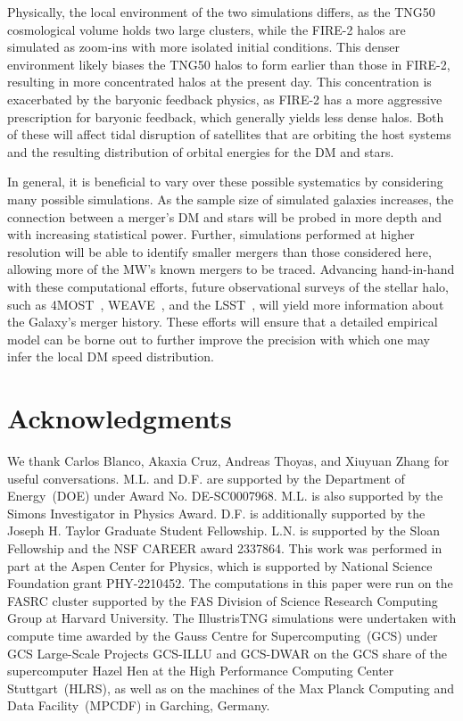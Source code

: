 \documentclass[twocolumn,tighten,twocolappendix]{aastex701}
\begin{document}
Physically, the local environment of the two simulations differs, as the TNG50 cosmological volume holds two large clusters, while the FIRE-2 halos are simulated as zoom-ins with more isolated initial conditions. This denser environment likely biases the TNG50 halos to form earlier than those in FIRE-2, resulting in more concentrated halos at the present day. This concentration is exacerbated by the baryonic feedback physics, as FIRE-2 has a more aggressive prescription for baryonic feedback, which generally yields less dense halos. Both of these will affect tidal disruption of satellites that are orbiting the host systems and the resulting distribution of orbital energies for the DM and stars. 

In general, it is beneficial to vary over these possible systematics by considering many possible simulations. As the sample size of simulated galaxies increases, the connection between a merger's DM and stars will be probed in more depth and with increasing statistical power. Further, simulations performed at higher resolution will be able to identify smaller mergers than those considered here, allowing more of the MW's known mergers to be traced. Advancing hand-in-hand with these computational efforts, future observational surveys of the stellar halo, such as 4MOST~\citep{2019Msngr.175...23H}, WEAVE~\citep{2024MNRAS.530.2688J}, and the LSST~\citep{2019ApJ...873..111I}, will yield more information about the Galaxy's merger history. These efforts will ensure that a detailed empirical model can be borne out to further improve the precision with which one may infer the local DM speed distribution.

\section*{Acknowledgments}
We thank Carlos Blanco, Akaxia Cruz, Andreas Thoyas, and Xiuyuan Zhang for useful conversations. M.L. and D.F. are supported by the Department of Energy~(DOE) under Award No. DE-SC0007968. M.L. is also supported by the Simons Investigator in Physics Award. D.F. is additionally supported by the Joseph H. Taylor Graduate Student Fellowship. L.N. is supported by the Sloan Fellowship and the NSF CAREER award 2337864. This work was performed in part at the Aspen Center for Physics, which is supported by National Science Foundation grant PHY-2210452. The computations in this paper were run on the FASRC cluster supported by the FAS Division of Science Research Computing Group at Harvard University. The IllustrisTNG simulations were undertaken with compute time awarded by the Gauss Centre for Supercomputing~(GCS) under GCS Large-Scale Projects GCS-ILLU and GCS-DWAR on the GCS share of the supercomputer Hazel Hen at the High Performance Computing Center Stuttgart~(HLRS), as well as on the machines of the Max Planck Computing and Data Facility~(MPCDF) in Garching, Germany.
\end{document}
